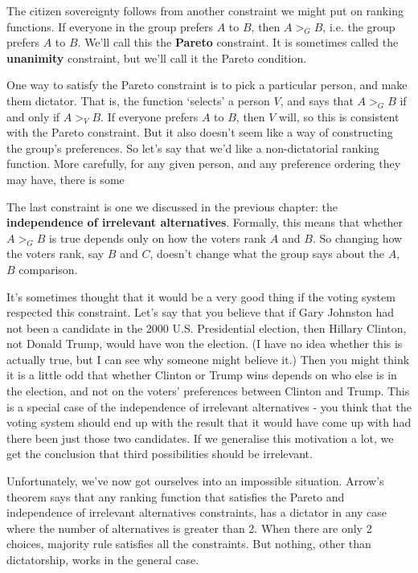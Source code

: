 \documentclass[openany]{book}
\begin{document}
The citizen sovereignty follows from another constraint we might put on ranking functions. If everyone in the group prefers $A$ to $B$, then $A >_G B$, i.e. the group prefers $A$ to $B$. We'll call this the \textbf{Pareto} constraint. It is sometimes called the \textbf{unanimity} constraint, but we'll call it the Pareto condition.

One way to satisfy the Pareto constraint is to pick a particular person, and make them dictator. That is, the function `selects' a person $V$, and says that $A >_G B$ if and only if $A >_V B$. If everyone prefers $A$ to $B$, then $V$ will, so this is consistent with the Pareto constraint. But it also doesn't seem like a way of constructing the group's preferences. So let's say that we'd like a non-dictatorial ranking function. More carefully, for any given person, and any preference ordering they may have, there is some 

The last constraint is one we discussed in the previous chapter: the \textbf{independence of irrelevant alternatives}. Formally, this means that whether $A >_G B$ is true depends only on how the voters rank $A$ and $B$. So changing how the voters rank, say $B$ and $C$, doesn't change what the group says about the $A$, $B$ comparison.

It's sometimes thought that it would be a very good thing if the voting system respected this constraint. Let's say that you believe that if Gary Johnston had not been a candidate in the 2000 U.S. Presidential election, then Hillary Clinton, not Donald Trump, would have won the election. (I have no idea whether this is actually true, but I can see why someone might believe it.) Then you might think it is a little odd that whether Clinton or Trump wins depends on who else is in the election, and not on the voters' preferences between Clinton and Trump. This is a special case of the independence of irrelevant alternatives - you think that the voting system should end up with the result that it would have come up with had there been just those two candidates. If we generalise this motivation a lot, we get the conclusion that third possibilities should be irrelevant.

Unfortunately, we've now got ourselves into an impossible situation. Arrow's theorem says that any ranking function that satisfies the Pareto and independence of irrelevant alternatives constraints, has a dictator in any case where the number of alternatives is greater than 2. When there are only 2 choices, majority rule satisfies all the constraints. But nothing, other than dictatorship, works in the general case.
\end{document}
